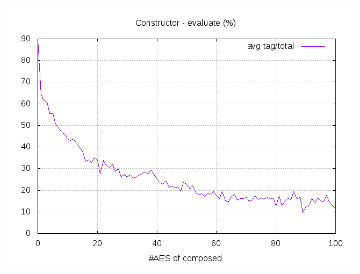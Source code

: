 \documentclass[10pt,a4paper]{article}
\begin{document}
\begin{figure}[h]
\begin{subfigure}[t]{0.3\textwidth}
        \includegraphics[width=\textwidth]{const_eval_frac}
        \caption{}
        \label{data const eval frac}
    \end{subfigure}


\end{figure}
\end{document}
